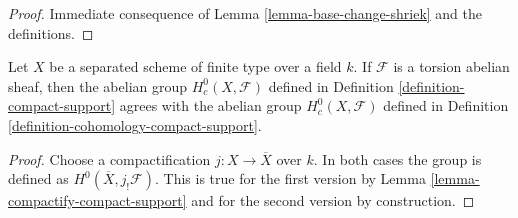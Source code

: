 \begin{proof}
Immediate consequence of Lemma \ref{lemma-base-change-shriek} and the
definitions.
\end{proof}

\begin{lemma}
\label{lemma-compact-support-h0}
Let $X$ be a separated scheme of finite type over a field $k$.
If $\mathcal{F}$ is a torsion abelian sheaf, then the abelian group
$H^0_c(X, \mathcal{F})$ defined in Definition \ref{definition-compact-support}
agrees with the abelian group $H^0_c(X, \mathcal{F})$ defined in
Definition \ref{definition-cohomology-compact-support}.
\end{lemma}

\begin{proof}
Choose a compactification $j : X \to \overline{X}$ over $k$.
In both cases the group is defined as $H^0(\overline{X}, j_!\mathcal{F})$.
This is true for the first version by
Lemma \ref{lemma-compactify-compact-support}
and for the second version by construction.
\end{proof}













